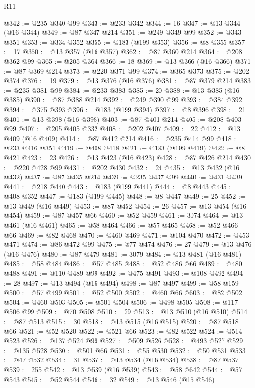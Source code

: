 \begin{lexlean}{R11}
\begin{coremodule}
@342 := @235 @340 @99
@343 := @233 @342
@344 := 16
@347 := @13 @344 (@16 @344)
@349 := @87 @347 @214
@351 := @249 @349 @99
@352 := @343 @351
@353 := @334 @352
@355 := @183 (@199 @353)
@356 := @8 @355
@357 := 17
@360 := @13 @357 (@16 @357)
@362 := @87 @360 @214
@364 := @208 @362 @99
@365 := @205 @364
@366 := 18
@369 := @13 @366 (@16 @366)
@371 := @87 @369 @214
@373 := @220 @371 @99
@374 := @365 @373
@375 := @202 @374
@376 := 19
@379 := @13 @376 (@16 @376)
@381 := @87 @379 @214
@383 := @235 @381 @99
@384 := @233 @383
@385 := 20
@388 := @13 @385 (@16 @385)
@390 := @87 @388 @214
@392 := @249 @390 @99
@393 := @384 @392
@394 := @375 @393
@396 := @183 (@199 @394)
@397 := @8 @396
@398 := 21
@401 := @13 @398 (@16 @398)
@403 := @87 @401 @214
@405 := @208 @403 @99
@407 := @205 @405 @332
@408 := @202 @407
@409 := 22
@412 := @13 @409 (@16 @409)
@414 := @87 @412 @214
@416 := @235 @414 @99
@418 := @233 @416 @351
@419 := @408 @418
@421 := @183 (@199 @419)
@422 := @8 @421
@423 := 23
@426 := @13 @423 (@16 @423)
@428 := @87 @426 @214
@430 := @220 @428 @99
@431 := @202 @430
@432 := 24
@435 := @13 @432 (@16 @432)
@437 := @87 @435 @214
@439 := @235 @437 @99
@440 := @431 @439
@441 := @218 @440
@443 := @183 (@199 @441)
@444 := @8 @443
@445 := @408 @352
@447 := @183 (@199 @445)
@448 := @8 @447
@449 := 25
@452 := @13 @449 (@16 @449)
@453 := @87 @452
@454 := 26
@457 := @13 @454 (@16 @454)
@459 := @87 @457 @66
@460 := @52 @459
@461 := 3074
@464 := @13 @461 (@16 @461)
@465 := @58 @464
@466 := @57 @465
@468 := @52 @466 @66
@469 := @82 @468
@470 := @460 @469
@471 := @104 @470
@472 := @453 @471
@474 := @86 @472 @99
@475 := @77 @474
@476 := 27
@479 := @13 @476 (@16 @476)
@480 := @87 @479
@481 := 3079
@484 := @13 @481 (@16 @481)
@485 := @58 @484
@486 := @57 @485
@488 := @52 @486 @66
@489 := @480 @488
@491 := @110 @489 @99
@492 := @475 @491
@493 := @108 @492
@494 := 28
@497 := @13 @494 (@16 @494)
@498 := @87 @497
@499 := @58 @159
@500 := @57 @499
@501 := @52 @500
@502 := @460 @66
@503 := @82 @502
@504 := @460 @503
@505 := @501 @504
@506 := @498 @505
@508 := @117 @506 @99
@509 := @70 @508
@510 := 29
@513 := @13 @510 (@16 @510)
@514 := @87 @513
@515 := 30
@518 := @13 @515 (@16 @515)
@520 := @87 @518 @66
@521 := @52 @520
@522 := @521 @66
@523 := @82 @522
@524 := @514 @523
@526 := @137 @524 @99
@527 := @509 @526
@528 := @493 @527
@529 := @135 @528
@530 := @501 @66
@531 := @55 @530
@532 := @50 @531
@533 := @47 @532
@534 := 31
@537 := @13 @534 (@16 @534)
@538 := @87 @537
@539 := 255
@542 := @13 @539 (@16 @539)
@543 := @58 @542
@544 := @57 @543
@545 := @52 @544
@546 := 32
@549 := @13 @546 (@16 @546)

\end{coremodule}
\end{lexlean}
